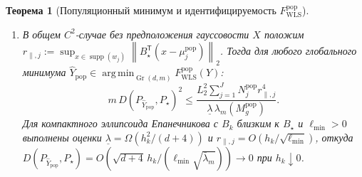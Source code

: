 \documentclass[11pt,a4paper]{article}
\numberwithin{equation}{section}
\newtheorem{theorem}{Теорема}[section]
\theoremstyle{definition}
\theoremstyle{remark}
\newcommand{\supp}{\operatorname{supp}}
\newcommand{\Gr}{\operatorname{Gr}}
\newcommand{\T}{^{\mathsf T}}
\newcommand{\norm}[1]{\left\lVert #1 \right\rVert}
\DeclareMathOperator*{\argmin}{arg\,min}
\begin{document}
\begin{theorem}[Популяционный минимум и идентифицируемость $F_{\mathrm{WLS}}^{\mathrm{pop}}$]
\begin{enumerate}[label=(\alph*)]
  то $S_\star$ — единственный глобальный минимум $F_{\mathrm{WLS}}^{\mathrm{pop}}$ на $\Gr(d,m)$.
  \item В общем $C^2$-случае без предположения гауссовости $X$ положим
  $r_{\parallel, j} := \sup_{x \in \supp(w_j)} \norm{B_\star\T (x - \mu_j^{\mathrm{pop}})}_2$.
  Тогда для любого глобального минимума $\widehat{Y}_{\mathrm{pop}} \in \argmin_{\Gr(d,m)} F_{\mathrm{WLS}}^{\mathrm{pop}}(Y)$:
  \begin{equation}\label{eq:wls-nonasymp}
    m\, D(P_{\widehat{Y}_{\mathrm{pop}}}, P_\star)^2
    \le \frac{L_2^2 \sum_{j=1}^J N_j^{\mathrm{pop}} r_{\parallel, j}^4}{\underline{\lambda}\,\lambda_m(M_g^{\mathrm{pop}})}.
  \end{equation}
  Для компактного эллипсоида Епанечникова с $B_k$ близким к $B_\star$ и $\ell_{\min} > 0$
  выполнены оценки $\underline{\lambda} = \Omega(h_k^2 / (d+4))$ и $r_{\parallel, j} = O(h_k / \sqrt{\ell_{\min}})$,
  откуда $D(P_{\widehat{Y}_{\mathrm{pop}}}, P_\star) = O(\sqrt{d+4}\, h_k / (\ell_{\min}\sqrt{\bar\lambda_m})) \to 0$ при $h_k \downarrow 0$.
\end{enumerate}
\end{theorem}
\end{document}

